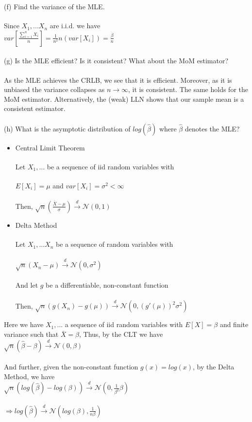 \documentclass{article}
\begin{document}
(f) Find the variance of the MLE.\\\\
Since $X_1,...X_n$ are i.i.d. we have\\
$var[\frac{\sum_{i=1}^nX_i}{n}]=\frac{1}{n^2}n(var[X_i])=\frac{\beta}{n}$\\\\
(g) Is the MLE efficient?  Is it consistent?  What about the MoM estimator?\\\\
As the MLE achieves the CRLB, we see that it is efficient.  Moreover, as it is unbiased the variance collapses as $n\rightarrow\infty$, it is consistent.  The same holds for the MoM estimator.  Alternatively, the (weak) LLN shows that our sample mean is a consistent estimator.\\\\
(h) What is the asymptotic distribution of $log(\hat{\beta})$ where $\hat{\beta}$ denotes the MLE?
\begin{itemize}
    \item Central Limit Theorem\\\\
    Let $X_1,...$ be a sequence of iid random variables with\\\\
    $E[X_i]=\mu$ and $var[X_i]=\sigma^2<\infty$\\\\
    Then, $\sqrt{n}(\frac{\bar{X}-\mu}{\sigma})\xrightarrow{d}\mathcal{N}(0,1)$
    \item Delta Method\\\\
    Let $X_1,...X_n$ be a sequence of random variables with\\\\
    $\sqrt{n}(X_n-\mu)\xrightarrow{d}\mathcal{N}(0,\sigma^2)$\\\\
    And let $g$ be a differentiable, non-constant function\\\\
    Then, $\sqrt{n}(g(X_n)-g(\mu))\xrightarrow{d}\mathcal{N}(0,(g'(\mu))^2\sigma^2)$
\end{itemize}
Here we have $X_1,...$ a sequence of iid random variables with $E[X]=\beta$ and finite variance such that $\bar{X}=\hat{\beta}$, Thus, by the CLT we have\\
$\sqrt{n}(\hat{\beta}-\beta)\xrightarrow{d}\mathcal{N}(0,\beta)$\\\\
And further, given the non-constant function $g(x)=log(x)$, by the Delta Method, we have\\
$\sqrt{n}(log(\hat{\beta})-log(\beta))\xrightarrow{d}\mathcal{N}(0,\frac{1}{\beta^2}\beta)$\\\\
$\Rightarrow log(\hat{\beta})\xrightarrow{d}\mathcal{N}(log(\beta),\frac{1}{n\beta})$\\\\
\end{document}
